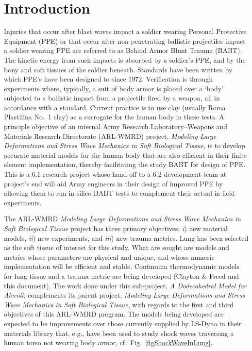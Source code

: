 \part{Introduction}
\label{partIntroduction}

Injuries that occur after blast waves impact a soldier wearing Personal Protective Equipment (PPE) or that occur after non-penetrating ballistic projectiles impact a soldier wearing PPE are referred to as Behind Armor Blunt Trauma (BABT).  The kinetic energy from such impacts is absorbed by a soldier's PPE, and by the bony and soft tissues of the soldier beneath.  Standards have been written by which PPE's have been designed to since 1972.  Verification is through experiments where, typically, a suit of body armor is placed over a `body' subjected to a ballistic impact from a projectile fired by a weapon, all in accordance with a standard.  Current practice is to use clay (usually Roma Plastilina No.~1 clay) as a surrogate for the human body in these tests.  A principle objective of an internal Army Research Laboratory--Weapons and Materials Research Directorate (ARL-WMRD) project, \textit{Modeling Large Deformations and Stress Wave Mechanics in Soft Biological Tissue}, is to develop accurate material models for the human body that are also efficient in their finite element implementation, thereby facilitating the study BABT for design of PPE.  This is a 6.1 research project whose hand-off to a 6.2 development team at project's end will aid Army engineers in their design of improved PPE by allowing them to run in-silico BABT tests to complement their actual in-field experiments.

The ARL-WMRD \textit{Modeling Large Deformations and Stress Wave Mechanics in Soft Biological Tissue\/} project has three primary objectives: \textit{i\/}) new material models, \textit{ii\/}) new experiments, and \textit{iii\/}) new trauma metrics.  Lung has been selected as the soft tissue of interest for this study.  What are sought are models and metrics whose parameters are physical and unique, and whose numeric implementation will be efficient and stable.  Continuum thermo\-dynamic models for lung tissue and a trauma metric are being developed (Clayton \& Freed \cite{ClaytonFreed19,ClaytonFreed20} and this document).  The work done under this sub-project, \textit{A Dodecahedral Model for Alveoli}, complements its parent project, \textit{Modeling Large Deformations and Stress Wave Mechanics in Soft Biological Tissue}, with regards to the first and third objectives of this ARL-WMRD program.  The models being developed are expected to be improvements over those currently supplied by LS-Dyna in their materials library that, e.g., have been used to study shock waves traversing a human torso not wearing body armor, cf.\ Fig.~\ref{figShockWaveInLung}.

